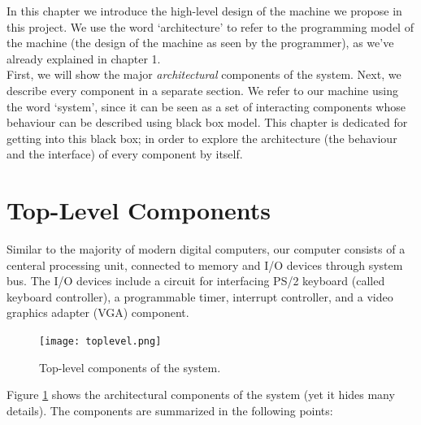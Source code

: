 \documentclass[oneside]{book}
\begin{document}
In this chapter we introduce the high-level design of the machine
we propose in this project. We use the word `architecture' to refer
to the programming model of the machine (the design of the machine as
seen by the programmer), as we've already explained in chapter 1.\\

First, we will show the major \textit{architectural} components of the
system. Next, we describe every component
in a separate section. We refer to our machine using the word `system',
since it can be seen as a set of interacting components whose behaviour can be
described using black box model. This chapter is dedicated for getting
into this black box; in order to explore the architecture (the behaviour
and the interface) of every component by itself.

\section{Top-Level Components}

Similar to the majority of modern digital computers, our computer consists
of a centeral processing unit, connected to memory and I/O devices
through system bus. The I/O devices include a circuit for interfacing
PS/2 keyboard (called keyboard controller), a programmable timer,
interrupt controller, and a video graphics adapter (VGA) component.\\

\begin{figure}[h]
\begin{center}
\texttt{[image: toplevel.png]}
\end{center}
\caption{Top-level components of the system.}
\label{toplevel}
\end{figure}

Figure \ref{toplevel} shows the architectural components of the system
(yet it hides many details). The components are summarized in the
following points:
\end{document}
